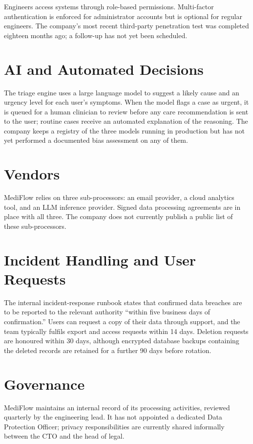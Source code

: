 \documentclass[acmsmall,nonacm]{acmart}
\begin{document}
Engineers access systems through role-based permissions. Multi-factor authentication is
enforced for administrator accounts but is optional for regular engineers. The company's
most recent third-party penetration test was completed eighteen months ago; a follow-up has
not yet been scheduled.

\section{AI and Automated Decisions}
The triage engine uses a large language model to suggest a likely cause and an urgency level
for each user's symptoms. When the model flags a case as urgent, it is queued for a human
clinician to review before any care recommendation is sent to the user; routine cases
receive an automated explanation of the reasoning. The company keeps a registry of the three
models running in production but has not yet performed a documented bias assessment on any
of them.

\section{Vendors}
MediFlow relies on three sub-processors: an email provider, a cloud analytics tool, and an
LLM inference provider. Signed data processing agreements are in place with all three. The
company does not currently publish a public list of these sub-processors.

\section{Incident Handling and User Requests}
The internal incident-response runbook states that confirmed data breaches are to be
reported to the relevant authority ``within five business days of confirmation.'' Users can
request a copy of their data through support, and the team typically fulfils export and
access requests within 14 days. Deletion requests are honoured within 30 days, although
encrypted database backups containing the deleted records are retained for a further 90 days
before rotation.

\section{Governance}
MediFlow maintains an internal record of its processing activities, reviewed quarterly by
the engineering lead. It has not appointed a dedicated Data Protection Officer; privacy
responsibilities are currently shared informally between the CTO and the head of legal.
\end{document}
